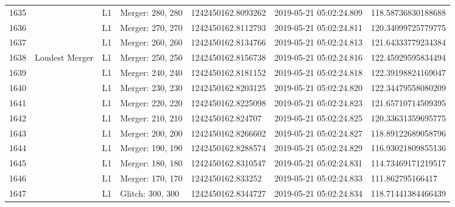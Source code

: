 \begin{longtable}{lllllll}
1635 &                                                    &       L1 &  Merger: 280, 280 &  1242450162.8093262 &  2019-05-21 05:02:24.809 &  118.58736830188688 \\
1636 &                                                    &       L1 &  Merger: 270, 270 &  1242450162.8112793 &  2019-05-21 05:02:24.811 &  120.34099725779775 \\
1637 &                                                    &       L1 &  Merger: 260, 260 &  1242450162.8134766 &  2019-05-21 05:02:24.813 &  121.64333779234384 \\
1638 &                                     Loudest Merger &       L1 &  Merger: 250, 250 &  1242450162.8156738 &  2019-05-21 05:02:24.816 &  122.45929595834494 \\
1639 &                                                    &       L1 &  Merger: 240, 240 &  1242450162.8181152 &  2019-05-21 05:02:24.818 &  122.39198824169047 \\
1640 &                                                    &       L1 &  Merger: 230, 230 &  1242450162.8203125 &  2019-05-21 05:02:24.820 &  122.34479558080209 \\
1641 &                                                    &       L1 &  Merger: 220, 220 &  1242450162.8225098 &  2019-05-21 05:02:24.823 &  121.65710714509395 \\
1642 &                                                    &       L1 &  Merger: 210, 210 &   1242450162.824707 &  2019-05-21 05:02:24.825 &  120.33631359695775 \\
1643 &                                                    &       L1 &  Merger: 200, 200 &  1242450162.8266602 &  2019-05-21 05:02:24.827 &  118.89122689058796 \\
1644 &                                                    &       L1 &  Merger: 190, 190 &  1242450162.8288574 &  2019-05-21 05:02:24.829 &  116.93021809855136 \\
1645 &                                                    &       L1 &  Merger: 180, 180 &  1242450162.8310547 &  2019-05-21 05:02:24.831 &  114.73469171219517 \\
1646 &                                                    &       L1 &  Merger: 170, 170 &   1242450162.833252 &  2019-05-21 05:02:24.833 &    111.862795166417 \\
1647 &                                                    &       L1 &  Glitch: 300, 300 &  1242450162.8344727 &  2019-05-21 05:02:24.834 &  118.71441384466439 \\

\end{longtable}
